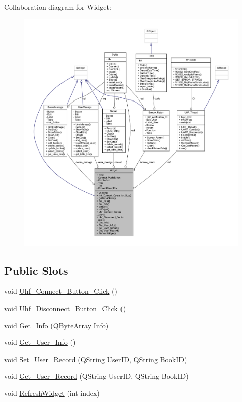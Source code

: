 Collaboration diagram for Widget\+:
\nopagebreak
\begin{figure}[H]
\begin{center}
\leavevmode
\includegraphics[width=350pt]{class_widget__coll__graph}
\end{center}
\end{figure}
\subsection*{Public Slots}
\begin{DoxyCompactItemize}
\item 
void \mbox{\hyperlink{class_widget_acceb5443a97ee9023250cda33f183bef}{Uhf\+\_\+\+Connect\+\_\+\+Button\+\_\+\+Click}} ()
\item 
void \mbox{\hyperlink{class_widget_a0186f9125495a90a0166280d932ae831}{Uhf\+\_\+\+Disconnect\+\_\+\+Button\+\_\+\+Click}} ()
\item 
void \mbox{\hyperlink{class_widget_a0b1204d50863ef19c6ed3e39ab455d25}{Get\+\_\+\+Info}} (Q\+Byte\+Array Info)
\item 
void \mbox{\hyperlink{class_widget_a349b456bf6a673058ef7449e44866e90}{Get\+\_\+\+User\+\_\+\+Info}} ()
\item 
void \mbox{\hyperlink{class_widget_a97f2c2eda030b7236e02c5f5e10c8926}{Set\+\_\+\+User\+\_\+\+Record}} (Q\+String User\+ID, Q\+String Book\+ID)
\item 
void \mbox{\hyperlink{class_widget_a743bf0399f3c3972556443c2576386be}{Get\+\_\+\+User\+\_\+\+Record}} (Q\+String User\+ID, Q\+String Book\+ID)
\item 
void \mbox{\hyperlink{class_widget_a07120b41431597f8e2d0eb86098a6ba7}{Refresh\+Widget}} (int index)
\end{DoxyCompactItemize}
